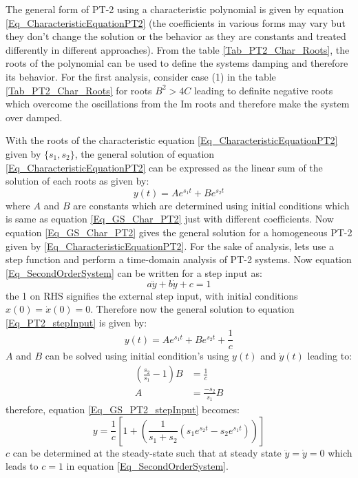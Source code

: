 The general form of PT-2 using a characteristic polynomial is given by equation \eqref{Eq_CharacteristicEquationPT2} (the coefficients in various forms may vary but they don't change the solution or the behavior as they are constants and treated differently in different approaches). From the table \ref{Tab_PT2_Char_Roots}, the roots of the polynomial can be used to define the systems damping and therefore its behavior. For the first analysis, consider case (1) in the table \ref{Tab_PT2_Char_Roots} for roots $B^{2} > 4C$ leading to definite negative roots which overcome the oscillations from the Im roots and therefore make the system over damped.

With the roots of the characteristic equation \eqref{Eq_CharacteristicEquationPT2} given by $\{s_1, s_2\}$, the general solution of equation \eqref{Eq_CharacteristicEquationPT2} can be expressed as the linear sum of the solution of each roots as given by:
\begin{equation}
	y(t) = A e^{s_{1}t} + B e^{s_{2}t}
\end{equation}
where $A$ and $B$ are constants which are determined using initial conditions which is same as equation \eqref{Eq_GS_Char_PT2} just with different coefficients. Now equation \eqref{Eq_GS_Char_PT2} gives the general solution for a homogeneous PT-2 given by \eqref{Eq_CharacteristicEquationPT2}. For the sake of analysis, lets use a step function and perform a time-domain analysis of PT-2 systems. Now equation \eqref{Eq_SecondOrderSystem} can be written for a step input as:
\begin{equation} \label{Eq_PT2_stepInput}
	a \ddot{y} + b \dot{y} + c = 1
\end{equation}
the 1 on RHS signifies the external step input, with initial conditions $x(0) = \dot{x}(0) = 0$. Therefore now the general solution to equation \eqref{Eq_PT2_stepInput} is given by:
\begin{equation} \label{Eq_GS_PT2_stepInput}
	y(t) = A e^{s_{1}t} + B e^{s_{2}t} + \frac{1}{c}
\end{equation}
$A$ and $B$ can be solved using initial condition's using $y(t)$ and $\dot{y}(t)$ leading to:
\begin{align*}
	\left(\frac{s_2}{s_1} - 1 \right) B &= \frac{1}{c} \\
	A &= \frac{-s_2}{s_1} B
\end{align*}
therefore, equation \eqref{Eq_GS_PT2_stepInput} becomes:
\begin{equation}
	y = \frac{1}{c} \left[ 1 + \left( \frac{1}{s_1 + s_2} (s_1 e^{s_{2}t} - s_2 e^{s_{1}t}) \right) \right]
\end{equation}
$c$ can be determined at the steady-state such that at steady state $\ddot{y} = \dot{y} = 0$ which leads to $c = 1$ in equation \eqref{Eq_SecondOrderSystem}.

